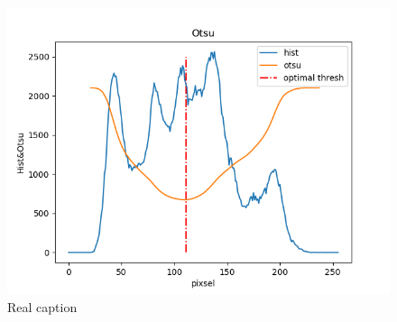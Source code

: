 \documentclass{article}
\begin{document}
\begin{figure}
   \centering
    \includegraphics[scale=0.6]{otsu.png}
   \caption[Caption for LOF]{Real caption\protect\footnotemark}
\end{figure}
\end{document}
